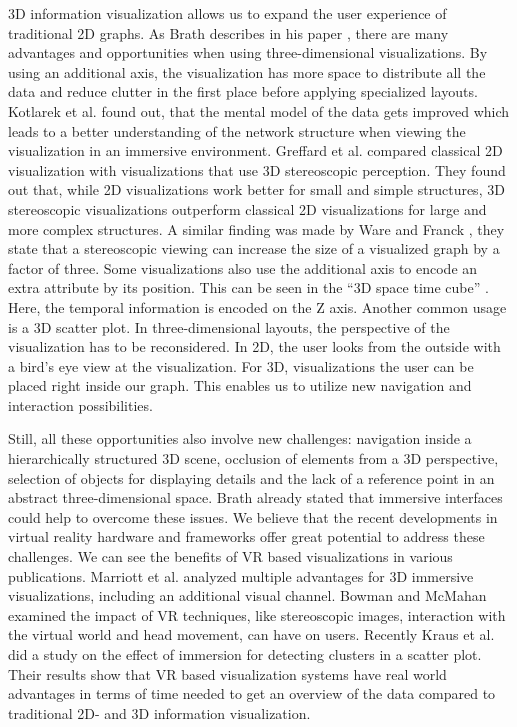 3D information visualization allows us to expand the user experience of traditional 2D graphs. As Brath describes in his paper \cite{brath_3d_2014}, there are many advantages and opportunities when using three-dimensional visualizations.
By using an additional axis, the visualization has more space to distribute all the data and reduce clutter in the first place before applying specialized layouts. 
Kotlarek et al. \cite{kotlarek_study_2020} found out, that the mental model of the data gets improved which leads to a better understanding of the network structure when viewing the visualization in an immersive environment.
Greffard et al. \cite{greffard_visual_2012} compared classical 2D visualization with visualizations that use 3D stereoscopic perception. They found out that, while 2D visualizations work better for small and simple structures, 3D stereoscopic visualizations outperform classical 2D visualizations for large and more complex structures.
A similar finding was made by Ware and Franck \cite{ware_evaluating_1996}, they state that a stereoscopic viewing can increase the size of a visualized graph by a factor of three.
Some visualizations also use the additional axis to encode an extra attribute by its position. This can be seen in the “3D space time cube” \cite{brath_3d_2014}. Here, the temporal information is encoded on the Z axis. Another common usage is a 3D scatter plot.
In three-dimensional layouts, the perspective of the visualization has to be reconsidered. In 2D, the user looks from the outside with a bird's eye view at the visualization. For 3D, visualizations the user can be placed right inside our graph. This enables us to utilize new navigation and interaction possibilities.

Still, all these opportunities also involve new challenges: navigation inside a hierarchically structured 3D scene, occlusion of elements from a 3D perspective, selection of objects for displaying details and the lack of a reference point in an abstract three-dimensional space. Brath \cite{brath_3d_2014} already stated that immersive interfaces could help to overcome these issues.\label{chap:advantages_VR}
We believe that the recent developments in virtual reality hardware and frameworks offer great potential to address these challenges. 
We can see the benefits of VR based visualizations in various publications. 
Marriott et al. \cite{marriott_immersive_2018} analyzed multiple advantages for 3D immersive visualizations, including an additional visual channel.
Bowman and McMahan \cite{bowman_virtual_2007} examined the impact of VR techniques, like stereoscopic images, interaction with the virtual world and head movement, can have on users. 
Recently Kraus et al. \cite{kraus_impact_2020} did a study on the effect of immersion for detecting clusters in a scatter plot. Their results show that VR based visualization systems have real world advantages in terms of time needed to get an overview of the data compared to traditional 2D- and 3D information visualization. 
 
